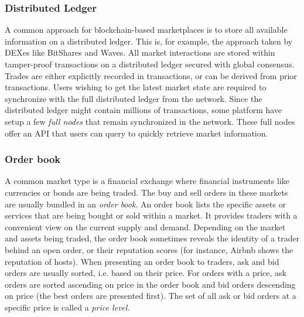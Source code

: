 \subsubsection{Distributed Ledger}
A common approach for blockchain-based marketplaces is to store all available information on a distributed ledger.
This is, for example, the approach taken by DEXes like BitShares and Waves.
All market interactions are stored within tamper-proof transactions on a distributed ledger secured with global consensus.
Trades are either explicitly recorded in transactions, or can be derived from prior transactions.
Users wishing to get the latest market state are required to synchronize with the full distributed ledger from the network.
Since the distributed ledger might contain millions of transactions, some platform have setup a few \emph{full nodes} that remain synchronized in the network.
These full nodes offer an API that users can query to quickly retrieve market information.

\subsubsection{Order book}
A common market type is a financial exchange where financial instruments like currencies or bonds are being traded.
The buy and sell orders in these markets are usually bundled in an \emph{order book}.
An order book lists the specific assets or services that are being bought or sold within a market.
It provides traders with a convenient view on the current supply and demand.
Depending on the market and assets being traded, the order book sometimes reveals the identity of a trader behind an open order, or their reputation scores (for instance, Airbnb shows the reputation of hosts).
When presenting an order book to traders, ask and bid orders are usually sorted, i.e. based on their price.
For orders with a price, ask orders are sorted ascending on price in the order book and bid orders descending on price (the best orders are presented first).
The set of all ask or bid orders at a specific price is called a \emph{price level}.

